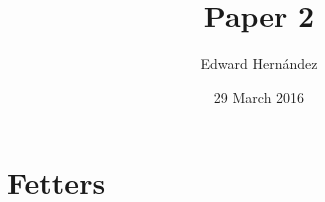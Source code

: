 \documentclass[man,12pt,natbib]{apa6}
\begin{document}
\title{Paper 2}
\author{Edward Hern\'{a}ndez}
\date{29 March 2016}
\maketitle


\section{Fetters}


\end{document}
